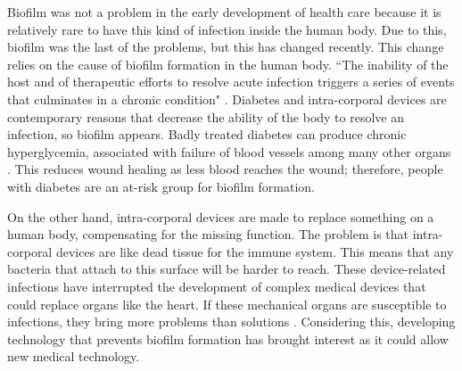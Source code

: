 
Biofilm was not a problem in the early development of health care because it is relatively rare to have this kind of infection inside the human body. Due to this, biofilm was the last of the problems, but this has changed recently. This change relies on the cause of biofilm formation in the human body. ``The inability of the host and of therapeutic efforts to resolve acute infection triggers a series of events that culminates in a chronic condition" \cite{CiernyIII2006TreatmentInfection}. Diabetes and intra-corporal devices are contemporary reasons that decrease the ability of the body to resolve an infection, so biofilm appears. Badly treated diabetes can produce chronic hyperglycemia, associated with failure of blood vessels among many other organs \cite{2014DiagnosisMellitus}. This reduces wound healing as less blood reaches the wound; therefore, people with diabetes are an at-risk group for biofilm formation.

On the other hand, intra-corporal devices are made to replace something on a human body, compensating for the missing function. The problem is that intra-corporal devices are like dead tissue for the immune system. This means that any bacteria that attach to this surface will be harder to reach. These device-related infections have interrupted the development of complex medical devices that could replace organs like the heart. If these mechanical organs are susceptible to infections, they bring more problems than solutions \cite{Costerton1999IntroductionBiofilm}. Considering this, developing technology that prevents biofilm formation has brought interest as it could allow new medical technology.

